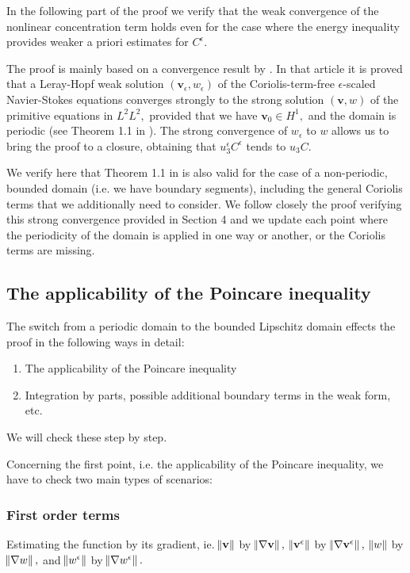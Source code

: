\documentclass[11pt]{article}
\begin{document}
In the following part of the proof we verify that the weak convergence of the nonlinear concentration term holds even for the case where the energy inequality provides weaker a priori estimates for $C^\epsilon.$

The proof is mainly based on a convergence result by \cite{li2019primitive}. In that article it is proved that a Leray-Hopf weak solution $(\mathbf{v}_\epsilon, w_\epsilon)$ of the Coriolis-term-free $\epsilon$-scaled Navier-Stokes equations converges strongly to the strong solution $(\mathbf{v}, w)$ of the primitive equations in $L^2 L^2,$ provided that we have $\mathbf{v}_0 \in H^1,$ and the domain is periodic (see Theorem 1.1 in \cite{li2019primitive}). The strong convergence of $w_\epsilon$ to $w$ allows us to bring the proof to a closure, obtaining that $u_3^\epsilon C^\epsilon$ tends to $u_3 C.$

We verify here that Theorem 1.1 in \cite{li2019primitive} is also valid for the case of a non-periodic, bounded domain (i.e. we have boundary segments), including the general Coriolis terms that we additionally need to consider. We follow closely the proof verifying this strong convergence provided in Section 4 and we update each point where the periodicity of the domain is applied in one way or another, or the Coriolis terms are missing.

\subsection{The applicability of the Poincare inequality}

The switch from a periodic domain to the bounded Lipschitz domain effects the proof in the following ways in detail:

\begin{enumerate}[label=\roman*)]
  \item The applicability of the Poincare inequality
  \item Integration by parts, possible additional boundary terms in the weak form, etc.
\end{enumerate}

We will check these step by step.

Concerning the first point, i.e. the applicability of the Poincare inequality, we have to check two main types of scenarios:

\subsubsection{First order terms}
  Estimating the function by its gradient, ie. $\norm{\mathbf{v}}$ by $\norm{\nabla \mathbf{v}}, $ $\norm{\mathbf{v}^\epsilon}$ by $\norm{\nabla \mathbf{v}^\epsilon}, $ $\norm{w}$ by $\norm{\nabla w}, $ and $\norm{w^\epsilon}$ by $\norm{\nabla w^\epsilon}. $
  
\end{document}
